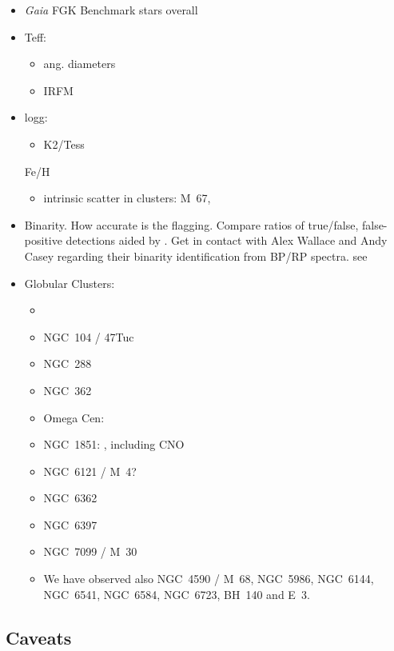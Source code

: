 \documentclass[
  journal=pasa,
  manuscript=research-paper, %
  year=2021,
  volume=37
]{cup-journal}
\newcommand{\Gaia}{\textit{Gaia}\xspace}
\begin{document}
\begin{itemize}
    \item \Gaia FGK Benchmark stars overall \citep{Jofre2018}
    \item Teff:
    \begin{itemize}
        \item ang. diameters \citep{Karovicova2018,Karovicova2020}
        \item IRFM \citep{Casagrande2020}
    \end{itemize}
    \item logg:
    \begin{itemize}
        \item K2/Tess \citet{Zinn2020}
    \end{itemize}
    \item [Fe/H]
    \begin{itemize}
        \item intrinsic scatter in clusters: M~67, 
    \end{itemize}
    \item Binarity. How accurate is the flagging. Compare ratios of true/false, false-positive detections aided by \citet{Traven2020}. Get in contact with Alex Wallace and Andy Casey regarding their binarity identification from BP/RP spectra. see
    \item Globular Clusters:
    \begin{itemize}
        \item \citet{Carretta2009, Carretta2009b}
        \item NGC~104 / 47Tuc
        \item NGC~288
        \item NGC~362
        \item Omega Cen: \cite{Johnson2010}
        \item NGC~1851: \citet{Yong2015}, including CNO
        \item NGC~6121 / M~4?
        \item NGC~6362
        \item NGC~6397
        \item NGC~7099 / M~30
        \item We have observed also NGC~4590 / M~68, NGC~5986, NGC~6144, NGC~6541, NGC~6584, NGC~6723, BH~140 and E~3.
\end{itemize}
    
\end{itemize}

\subsection{Caveats}
\end{document}
